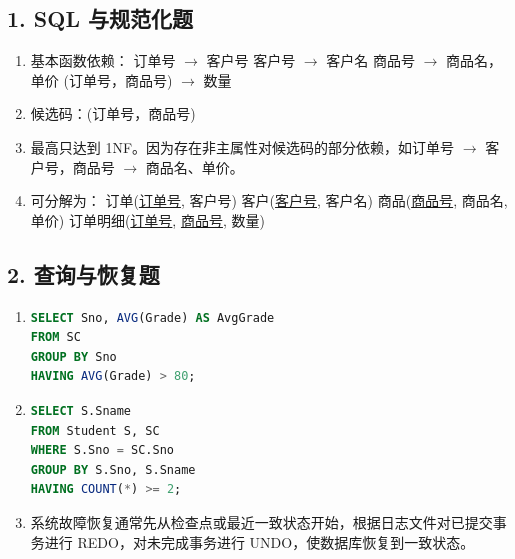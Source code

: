 \documentclass{../../note}
\begin{document}
\subsection*{1. SQL 与规范化题}

\begin{enumerate}[label=(\arabic*), itemsep=0.8em]
\item 基本函数依赖：\newline
订单号 $\rightarrow$ 客户号\newline
客户号 $\rightarrow$ 客户名\newline
商品号 $\rightarrow$ 商品名，单价\newline
(订单号，商品号) $\rightarrow$ 数量
\item 候选码：(订单号，商品号)
\item 最高只达到 1NF。因为存在非主属性对候选码的部分依赖，如订单号 $\rightarrow$ 客户号，商品号 $\rightarrow$ 商品名、单价。
\item 可分解为：\newline
订单(\underline{订单号}, 客户号)\newline
客户(\underline{客户号}, 客户名)\newline
商品(\underline{商品号}, 商品名, 单价)\newline
订单明细(\underline{订单号}, \underline{商品号}, 数量)
\end{enumerate}

\subsection*{2. 查询与恢复题}

\begin{enumerate}[label=(\arabic*), itemsep=0.8em]
\item
\begin{lstlisting}[language=SQL]
SELECT Sno, AVG(Grade) AS AvgGrade
FROM SC
GROUP BY Sno
HAVING AVG(Grade) > 80;
\end{lstlisting}

\item
\begin{lstlisting}[language=SQL]
SELECT S.Sname
FROM Student S, SC
WHERE S.Sno = SC.Sno
GROUP BY S.Sno, S.Sname
HAVING COUNT(*) >= 2;
\end{lstlisting}

\item 系统故障恢复通常先从检查点或最近一致状态开始，根据日志文件对已提交事务进行 REDO，对未完成事务进行 UNDO，使数据库恢复到一致状态。
\end{enumerate}
\end{document}
